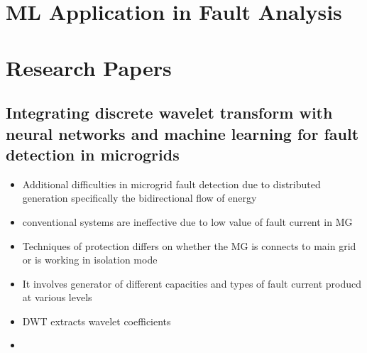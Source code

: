 \documentclass[14pt ,a4paper]{extarticle}
\begin{document}
\section{ML Application in Fault Analysis}

\section{ Research Papers }

\subsection{Integrating discrete wavelet transform with neural networks and machine
learning for fault detection in microgrids}

\begin{itemize}
    \item{Additional difficulties in microgrid fault detection due to distributed generation specifically the bidirectional flow of energy} 
    \item{conventional systems are ineffective due to low value of fault current in MG}
    \item{Techniques of protection differs on whether the MG is connects to main grid or is working in isolation mode}
    \item{It involves generator of different capacities and types of fault current producd at various levels}
    \item{DWT extracts wavelet coefficients}
    \item{}
\end{itemize}
\end{document}
